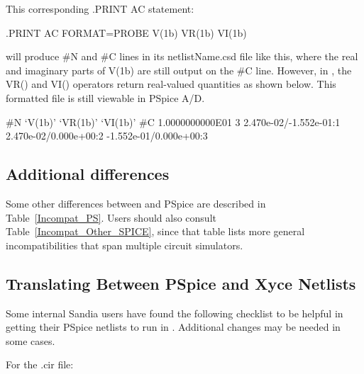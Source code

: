 This corresponding \Xyce{} .PRINT AC statement:
\begin{vquote}
.PRINT AC FORMAT=PROBE V(1b) VR(1b) VI(1b)
\end{vquote}
will produce \#N and \#C lines in its netlistName.csd file like this, where the real
and imaginary parts of V(1b) are still output on the \#C line.  However, in \Xyce{},
the VR() and VI() operators return real-valued quantities as shown below.  This
\Xyce{} formatted file is still viewable in PSpice A/D.
\begin{vquote}
#N
`V(1b)' `VR(1b)' `VI(1b)'
#C 1.0000000000E01 3
2.470e-02/-1.552e-01:1 2.470e-02/0.000e+00:2 -1.552e-01/0.000e+00:3
\end{vquote}

\subsection{Additional differences}
Some other differences between \Xyce{} and PSpice are described in 
Table~\ref{Incompat_PS}.  Users should also consult 
Table~\ref{Incompat_Other_SPICE}, since that table lists more general
incompatibilities that span multiple circuit simulators.



\subsection{Translating Between PSpice and Xyce Netlists}
Some internal Sandia users have found the following checklist to be helpful
in getting their PSpice netlists to run in \Xyce{}.  Additional changes may
be needed in some cases.

For the .cir file:

